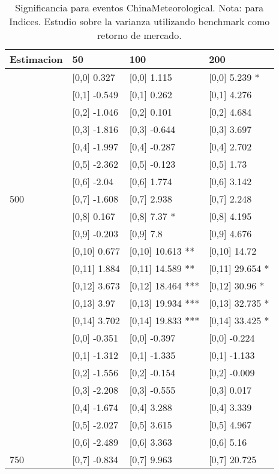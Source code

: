 \begin{table}

\caption{Significancia para eventos ChinaMeteorological. Nota: para Indices. Estudio sobre la varianza utilizando benchmark como retorno de mercado.}
\centering
\begin{tabular}[t]{llll}
\toprule
Estimacion & 50 & 100 & 200\\
\midrule
 & {}[0,0] 0.327 & {}[0,0] 1.115 & {}[0,0] 5.239 *\\
 & {}[0,1] -0.549 & {}[0,1] 0.262 & {}[0,1] 4.276\\
 & {}[0,2] -1.046 & {}[0,2] 0.101 & {}[0,2] 4.684\\
 & {}[0,3] -1.816 & {}[0,3] -0.644 & {}[0,3] 3.697\\
 & {}[0,4] -1.997 & {}[0,4] -0.287 & {}[0,4] 2.702\\
\addlinespace
 & {}[0,5] -2.362 & {}[0,5] -0.123 & {}[0,5] 1.73\\
 & {}[0,6] -2.04 & {}[0,6] 1.774 & {}[0,6] 3.142\\
500 & {}[0,7] -1.608 & {}[0,7] 2.938 & {}[0,7] 2.248\\
 & {}[0,8] 0.167 & {}[0,8] 7.37 * & {}[0,8] 4.195\\
 & {}[0,9] -0.203 & {}[0,9] 7.8 & {}[0,9] 4.676\\
\addlinespace
 & {}[0,10] 0.677 & {}[0,10] 10.613 ** & {}[0,10] 14.72\\
 & {}[0,11] 1.884 & {}[0,11] 14.589 ** & {}[0,11] 29.654 *\\
 & {}[0,12] 3.673 & {}[0,12] 18.464 *** & {}[0,12] 30.96 *\\
 & {}[0,13] 3.97 & {}[0,13] 19.934 *** & {}[0,13] 32.735 *\\
 & {}[0,14] 3.702 & {}[0,14] 19.833 *** & {}[0,14] 33.425 *\\
\addlinespace
 & {}[0,0] -0.351 & {}[0,0] -0.397 & {}[0,0] -0.224\\
 & {}[0,1] -1.312 & {}[0,1] -1.335 & {}[0,1] -1.133\\
 & {}[0,2] -1.556 & {}[0,2] -0.154 & {}[0,2] -0.009\\
 & {}[0,3] -2.208 & {}[0,3] -0.555 & {}[0,3] 0.017\\
 & {}[0,4] -1.674 & {}[0,4] 3.288 & {}[0,4] 3.339\\
\addlinespace
 & {}[0,5] -2.027 & {}[0,5] 3.615 & {}[0,5] 4.967\\
 & {}[0,6] -2.489 & {}[0,6] 3.363 & {}[0,6] 5.16\\
750 & {}[0,7] -0.834 & {}[0,7] 9.963 & {}[0,7] 20.725\\

\end{tabular}
\end{table}
